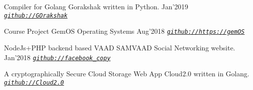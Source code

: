 \begin{cventries}
  \smallcventry
  {Compiler for Golang}
  {Gorakshak}
  {written in Python.}
  {Jan'2019}
  {{\emph{\texttt{\href{https://github.com/vinayaktrivedi/GOrakshak}{github://GOrakshak}}}}}
  {}

  \smallcventry
  {Course Project}
  {GemOS}
  {Operating Systems}
  {Aug'2018}
  {{\emph{\texttt{\href{https://github.com/vinayaktrivedi/gemOS}{github://https://gemOS}}}}}
  {}

  \smallcventry
  {NodeJs+PHP backend based}
  {VAAD SAMVAAD}
  {Social Networking website.}
  {Jan'2018}
  {{\emph{\texttt{\href{https://github.com/vinayaktrivedi/facebook-copy}{github://facebook\_copy}}}}}
  {}

  \smallcventry
  {A cryptographically Secure Cloud Storage Web App}
  {Cloud2.0}
  {written in Golang.}
  {}
  {{\emph{\texttt{\href{https://github.com/vinayaktrivedi/Cloud2.0}{github://Cloud2.0}}}}}
  {}

\end{cventries}
\vspace{-1mm}

